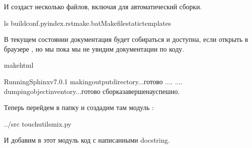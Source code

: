 \documentclass[letterpaper,10pt,russian]{sphinxmanual}
\begin{document}
\sphinxAtStartPar
И создаст несколько файлов, включая  для автоматический сборки.

\begin{sphinxVerbatim}[commandchars=\\\{\}]
ls
\PYGZus{}buildconf.pyindex.rstmake.batMakefile\PYGZus{}static\PYGZus{}templates
\end{sphinxVerbatim}

\sphinxAtStartPar
В текущем состоянии документация будет собираться и доступна, если открыть в браузере , но мы пока мы не увидим документации по коду.

\begin{sphinxVerbatim}[commandchars=\\\{\}]
makehtml

RunningSphinxv7.0.1
makingoutputdirectory...готово
....
....
dumpingobjectinventory...готово
сборказавершенауспешно.
\end{sphinxVerbatim}

\sphinxAtStartPar
Теперь перейдем в папку  и создадим там модуль :

\begin{sphinxVerbatim}[commandchars=\\\{\}]
../src
touchutils\PYGZus{}mix.py
\end{sphinxVerbatim}

\sphinxAtStartPar
И добавим в этот модуль код с написанными docstring.
\end{document}
